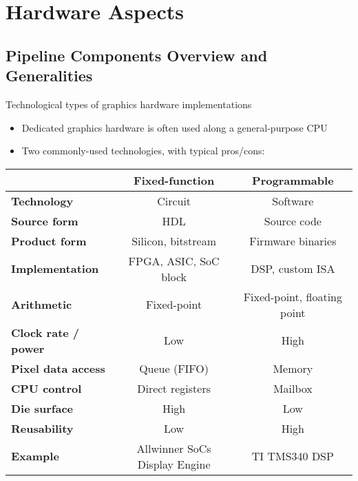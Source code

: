 \section{Hardware Aspects}

\subsection{Pipeline Components Overview and Generalities}

\begin{frame}{Technological types of graphics hardware implementations}
  \begin{itemize}
  \item Dedicated graphics hardware is often used along a general-purpose CPU
  \item Two commonly-used technologies, with typical pros/cons:
  \end{itemize}

  \begin{center}
  \small
  \def\arraystretch{1.2}
  \begin{tabular}{l|c|c}
  & \textbf{Fixed-function} & \textbf{Programmable} \\
  \hline
  \textbf{Technology} & Circuit & Software \\
  \textbf{Source form} & HDL & Source code \\
  \textbf{Product form} & Silicon, bitstream & Firmware binaries \\
  \textbf{Implementation} & FPGA, ASIC, SoC block & DSP, custom ISA \\
  \textbf{Arithmetic} & Fixed-point & Fixed-point, floating point \\
  \textbf{Clock rate / power} & Low & High \\
  \textbf{Pixel data access} & Queue (FIFO) & Memory \\
  \textbf{CPU control} & Direct registers & Mailbox \\
  \textbf{Die surface} & High & Low \\
  \textbf{Reusability} & Low & High \\
  \hline
  \textbf{Example} & Allwinner SoCs Display Engine & TI TMS340 DSP \\
  \end{tabular}
  \end{center}
\end{frame}

